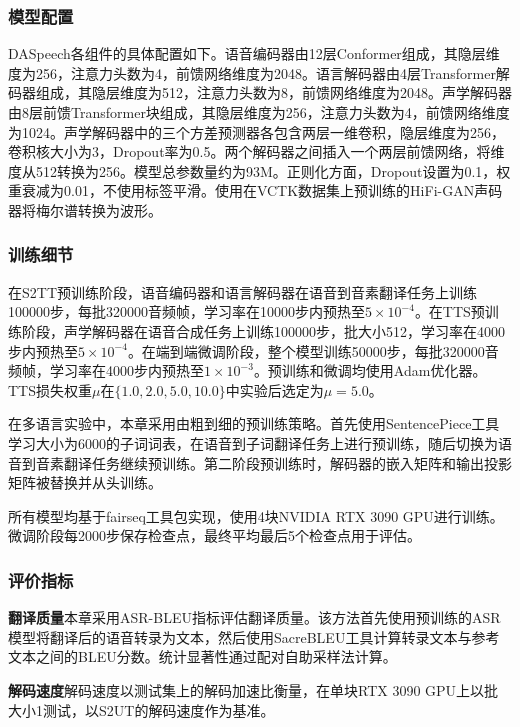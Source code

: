 \subsubsection{模型配置}

DASpeech各组件的具体配置如下。语音编码器由12层Conformer组成，其隐层维度为256，注意力头数为4，前馈网络维度为2048。语言解码器由4层Transformer解码器组成，其隐层维度为512，注意力头数为8，前馈网络维度为2048。声学解码器由8层前馈Transformer块组成，其隐层维度为256，注意力头数为4，前馈网络维度为1024。声学解码器中的三个方差预测器各包含两层一维卷积，隐层维度为256，卷积核大小为3，Dropout率为0.5。两个解码器之间插入一个两层前馈网络，将维度从512转换为256。模型总参数量约为93M。正则化方面，Dropout设置为0.1，权重衰减为0.01，不使用标签平滑。使用在VCTK数据集\citep{Veaux2017CSTRVC}上预训练的HiFi-GAN声码器将梅尔谱转换为波形。

\subsubsection{训练细节}

在S2TT预训练阶段，语音编码器和语言解码器在语音到音素翻译任务上训练100000步，每批320000音频帧，学习率在10000步内预热至$5\times 10^{-4}$。在TTS预训练阶段，声学解码器在语音合成任务上训练100000步，批大小512，学习率在4000步内预热至$5\times 10^{-4}$。在端到端微调阶段，整个模型训练50000步，每批320000音频帧，学习率在4000步内预热至$1\times 10^{-3}$。预训练和微调均使用Adam优化器\citep{adam}。TTS损失权重$\mu$在$\{1.0, 2.0, 5.0, 10.0\}$中实验后选定为$\mu=5.0$。

在多语言实验中，本章采用由粗到细的预训练策略。首先使用SentencePiece工具学习大小为6000的子词词表，在语音到子词翻译任务上进行预训练，随后切换为语音到音素翻译任务继续预训练。第二阶段预训练时，解码器的嵌入矩阵和输出投影矩阵被替换并从头训练。

所有模型均基于fairseq\citep{ott2019fairseq}工具包实现，使用4块NVIDIA RTX 3090 GPU进行训练。微调阶段每2000步保存检查点，最终平均最后5个检查点用于评估。

\subsubsection{评价指标}

\textbf{翻译质量}\quad 本章采用ASR-BLEU指标评估翻译质量。该方法首先使用预训练的ASR模型将翻译后的语音转录为文本，然后使用SacreBLEU\citep{post-2018-call}工具计算转录文本与参考文本之间的BLEU分数\citep{papineni-etal-2002-bleu}。统计显著性通过配对自助采样法计算。

\textbf{解码速度}\quad 解码速度以测试集上的解码加速比衡量，在单块RTX 3090 GPU上以批大小1测试，以S2UT的解码速度作为基准。

